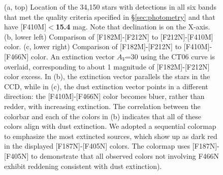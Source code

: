 \documentclass[times,astrosymb,twocolumn]{aastex631}
\def\todo#1{\textcolor{red}{#1}}
\newcommand\nstarsccd{34,150\xspace}
\def\rr#1{#1}
\def\fix#1{\textbf{#1}}
\begin{document}
\begin{figure}
    \centering
    \caption{
    (a, top) Location of the \nstarsccd stars with detections in all \rr{six} bands that met the quality criteria specified in \S \ref{sec:photometry} and that have [F410M]$<$\fix{15.4} \rr{mag}.
    Note that declination is on the X-axis.
    (b, lower left) Comparison of [F182M]-[F212N] to [F212N]-[F410M] color.
    (c, lower right) Comparison of [F182M]-[F212N] to [F410M]-[F466N] color.
    An extinction vector $A_V$=30 using the CT06 curve is overlaid, corresponding to about 1 magnitude of [F182M]-[F212N] color excess.
    In \rr{(b)}, the extinction vector \rr{parallels the stars in} the CCD, while in \rr{(c)}, \rr{the dust extinction vector points in a different direction: the [F410M]-[F466N] color becomes bluer, rather than redder,} with increasing extinction.
    The correlation between the colorbar and each of the colors \rr{in (b)} indicates that all of these colors align with dust extinction.
    We adopted a sequential colormap to emphasize the most extincted sources, which show up as dark red \rr{in the displayed [F187N]-[F405N] colors.
    The colormap uses [F187N]-[F405N] to demonstrate that all observed colors not involving F466N exhibit reddening consistent with dust extinction)}.
    }
    \label{fig:co_color}
\end{figure}
\end{document}
